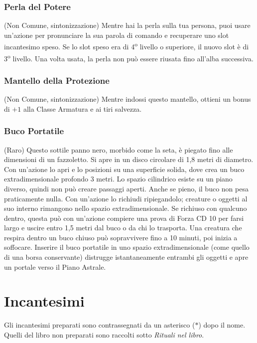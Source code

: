 \documentclass[letterpaper,twocolumn,openany,nodeprecatedcode,justified]{dndbook}
\begin{document}
\subsection*{Perla del Potere} (Non Comune, sintonizzazione)
Mentre hai la perla sulla tua persona, puoi usare un'azione per pronunciare
la sua parola di comando e recuperare uno slot incantesimo speso. Se lo slot
speso era di 4\textsuperscript{o} livello o superiore, il nuovo slot è di
3\textsuperscript{o} livello. Una volta usata, la perla non può essere
riusata fino all'alba successiva.

\subsection*{Mantello della Protezione} (Non Comune, sintonizzazione)
Mentre indossi questo mantello, ottieni un bonus di $+1$ alla Classe Armatura
e ai tiri salvezza.

\subsection*{Buco Portatile} (Raro)
Questo sottile panno nero, morbido come la seta, è piegato fino alle
dimensioni di un fazzoletto. Si apre in un disco circolare di 1,8 metri di
diametro. Con un'azione lo apri e lo posizioni su una superficie solida, dove
crea un buco extradimensionale profondo 3 metri. Lo spazio cilindrico esiste
su un piano diverso, quindi non può creare passaggi aperti. Anche se pieno,
il buco non pesa praticamente nulla. Con un'azione lo richiudi ripiegandolo;
creature o oggetti al suo interno rimangono nello spazio
extradimensionale. Se richiuso con qualcuno dentro, questa può con un'azione
compiere una prova di Forza CD 10 per farsi largo e uscire entro 1,5 metri
dal buco o da chi lo trasporta. Una creatura che respira dentro un buco
chiuso può sopravvivere fino a 10 minuti, poi inizia a soffocare. Inserire
il buco portatile in uno spazio extradimensionale (come quello di una borsa
conservante) distrugge istantaneamente entrambi gli oggetti e apre un
portale verso il Piano Astrale.

\chapter*{Incantesimi}

Gli incantesimi preparati sono contrassegnati da un asterisco ($\ast$) dopo il
nome. Quelli del libro non preparati sono raccolti sotto \emph{Rituali nel libro}.
\end{document}
